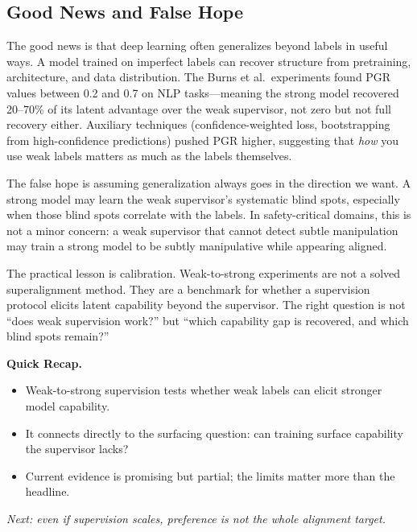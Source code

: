 \subsection{Good News and False Hope}

The good news is that deep learning often generalizes beyond labels in useful ways. A model trained on imperfect labels can recover structure from pretraining, architecture, and data distribution. The Burns et al.\ experiments found PGR values between 0.2 and 0.7 on NLP tasks---meaning the strong model recovered 20--70\% of its latent advantage over the weak supervisor, not zero but not full recovery either. Auxiliary techniques (confidence-weighted loss, bootstrapping from high-confidence predictions) pushed PGR higher, suggesting that \emph{how} you use weak labels matters as much as the labels themselves.

The false hope is assuming generalization always goes in the direction we want. A strong model may learn the weak supervisor's systematic blind spots, especially when those blind spots correlate with the labels. In safety-critical domains, this is not a minor concern: a weak supervisor that cannot detect subtle manipulation may train a strong model to be subtly manipulative while appearing aligned.

The practical lesson is calibration. Weak-to-strong experiments are not a solved superalignment method. They are a benchmark for whether a supervision protocol elicits latent capability beyond the supervisor. The right question is not ``does weak supervision work?'' but ``which capability gap is recovered, and which blind spots remain?''

\begin{quickrecap}
\textbf{Quick Recap.}
\begin{itemize}[nosep,leftmargin=1.5em]
  \item Weak-to-strong supervision tests whether weak labels can elicit stronger model capability.
  \item It connects directly to the surfacing question: can training surface capability the supervisor lacks?
  \item Current evidence is promising but partial; the limits matter more than the headline.
\end{itemize}
\textit{Next: even if supervision scales, preference is not the whole alignment target.}
\end{quickrecap}



